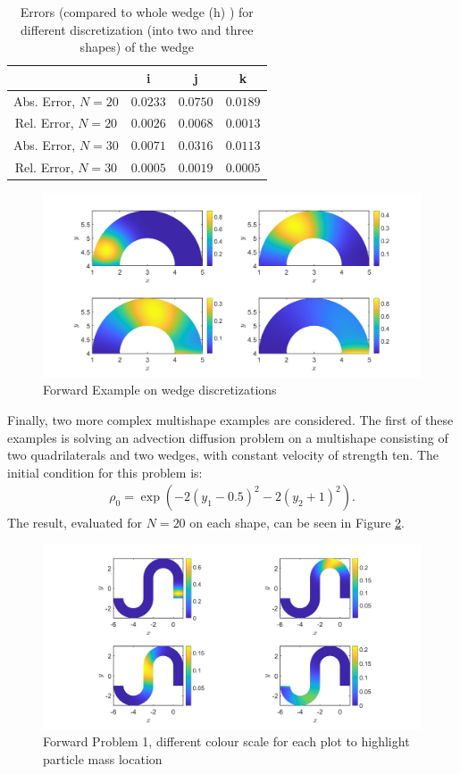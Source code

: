 \documentclass[11pt, a4paper]{article}
\theoremstyle{definition}
\begin{document}
\begin{table}
	\caption{Errors (compared to whole wedge (h) ) for different discretization (into two and three shapes) of the wedge}
	\begin{tabular}{ ||c| c| c| c|| }
		\hline
		\hline
		& i & j &k\\ 
		\hline
		Abs. Error, $N =20$& $0.0233 $ & $0.0750 $ & $0.0189 $ \\  
		Rel. Error, $N =20$& $0.0026 $& $0.0068 $ &$0.0013 $ \\
		Abs. Error, $N =30$& $0.0071 $ & $0.0316 $ & $0.0113 $  \\  
		Rel. Error, $N =30$ & $0.0005 $& $0.0019 $ &$ 0.0005$  \\
		\hline
		\hline
	\end{tabular}
	\label{Tab4:ErrorsFWWedge}
\end{table}
\begin{figure}[h]
	\centering
	\includegraphics[scale=0.35]{FWWedge.png}
	\caption{Forward Example on wedge discretizations} 
	\label{FFW2}
\end{figure}



Finally, two more complex multishape examples are considered.
The first of these examples is solving an advection diffusion problem on a multishape consisting of two quadrilaterals and two wedges, with constant velocity of strength ten. The initial condition for this problem is:
 \begin{align*}
 	\rho_0 = \exp( -2(y_1 -0.5)^2 - 2 (y_2 + 1)^2).
 \end{align*}
The result, evaluated for $N= 20$ on each shape, can be seen in Figure \ref{F8}.

\begin{figure}[h]
	\centering
	\includegraphics[scale=0.35]{ex1.png}
	\caption{Forward Problem 1, different colour scale for each plot to highlight particle mass location}
	\label{F8}
\end{figure}
\end{document}
